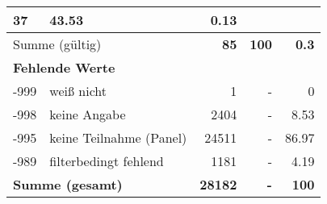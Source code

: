 \begin{longtable}{lXrrr}
       \num{37} &
       \num[round-mode=places,round-precision=2]{43,53} &
         \num[round-mode=places,round-precision=2]{0,13} \\
     \midrule
     \multicolumn{2}{l}{Summe (gültig)} &
       \textbf{\num{85}} &
     \textbf{100} &
       \textbf{\num[round-mode=places,round-precision=2]{0,3}} \\
     \multicolumn{5}{l}{\textbf{Fehlende Werte}}\\
       -999 &
       weiß nicht &
         \num{1} &
        - &
         \num[round-mode=places,round-precision=2]{0} \\
       -998 &
       keine Angabe &
         \num{2404} &
        - &
         \num[round-mode=places,round-precision=2]{8,53} \\
       -995 &
       keine Teilnahme (Panel) &
         \num{24511} &
        - &
         \num[round-mode=places,round-precision=2]{86,97} \\
       -989 &
       filterbedingt fehlend &
         \num{1181} &
        - &
         \num[round-mode=places,round-precision=2]{4,19} \\
     \midrule
     \multicolumn{2}{l}{\textbf{Summe (gesamt)}} &
          \textbf{\num{28182}} &
        \textbf{-} &
        \textbf{100} \\
     \bottomrule
     \end{longtable}
     
